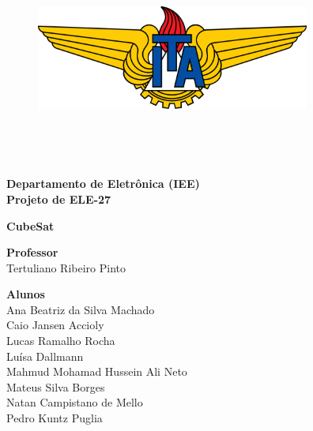 \begin{titlepage}
\begin{center}

\begin{figure}
\begin{center}
\includegraphics[width=9cm]{Images/ita-logo.png}
\end{center}
\end{figure}

\begin{huge}
\bf{} \\
\vspace*{0.15in}
\end{huge}

\begin{Large}
\bf{}\\
\end{Large}

\begin{Large}
\vspace*{0.2in}
\textbf{Departamento de Eletrônica (IEE)} \\
\textbf{Projeto de ELE-27} \\

\vfill

\textbf{CubeSat}
\end{Large}

\vfill


\begin{large}
    \begin{FlushLeft}
        \textbf{Professor} \\
        Tertuliano Ribeiro Pinto \\
    \end{FlushLeft}
\end{large}

\begin{large}

\begin{FlushLeft}
    \textbf{Alunos} \\
    Ana Beatriz da Silva Machado\\
    Caio Jansen Accioly\\
    Lucas Ramalho Rocha\\
    Luísa Dallmann\\
    Mahmud Mohamad Hussein Ali Neto\\
    Mateus Silva Borges\\
    Natan Campistano de Mello\\
    Pedro Kuntz Puglia \\
\end{FlushLeft}


\end{large}
\end{center}
\end{titlepage}

